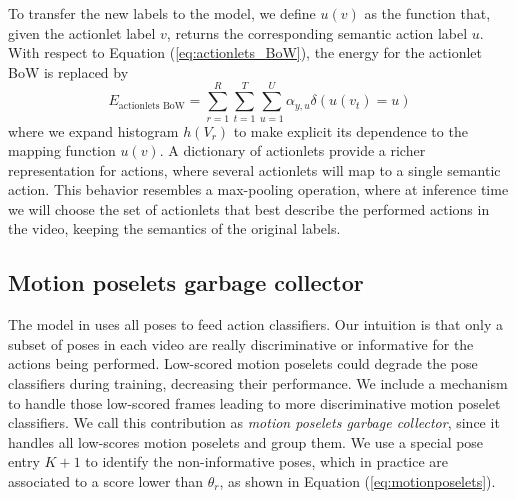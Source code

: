 To transfer the new labels to the model, we define $u(v)$ as the function that, 
given the actionlet label $v$, returns the corresponding semantic action 
label $u$. With respect to Equation (\ref{eq:actionlets_BoW}), the energy for 
the actionlet BoW is replaced by
{\small
\begin{equation}
E_{\text{actionlets BoW}} =  \sum_{r=1}^R\sum_{t=1}^T\sum_{u=1}^U \alpha_{y,u}\delta(u(v_t)=u)
\end{equation}}
where we expand histogram $h(V_r)$ to 
make explicit its dependence to the mapping function $u(v)$. A 
dictionary of actionlets provide a richer representation for actions, 
where several actionlets will map to a single semantic action. This 
behavior resembles a max-pooling operation, where at inference time we will 
choose the set of actionlets that best describe the performed actions in the 
video, keeping the semantics of the original labels. 

\subsection{Motion poselets garbage collector}
\label{subsec:garbage_collector}
The model in \cite{Lillo2014} uses all poses to feed action classifiers. Our 
intuition is that only a subset of poses in each video are really discriminative 
or informative for the actions being performed. Low-scored motion poselets 
could  degrade the pose classifiers during training, decreasing their 
performance. 
We include a mechanism to handle those low-scored 
frames leading to more discriminative motion poselet classifiers. 
We call this contribution as \emph{motion poselets garbage collector}, since it 
handles all low-scores motion poselets and group them. We use a special pose 
entry $K+1$ to identify the non-informative poses, which in practice are 
associated to a score lower than $\theta_r$, as shown in Equation 
(\ref{eq:motionposelets}).





 






